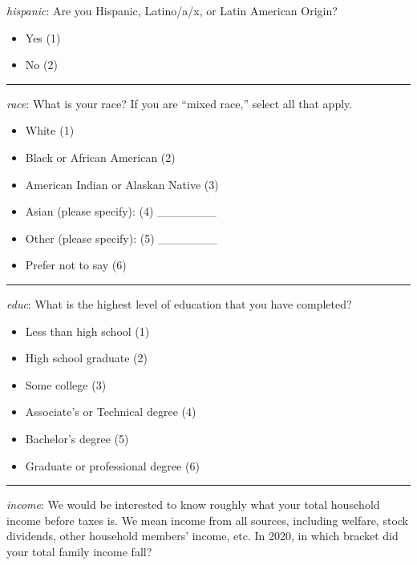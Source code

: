 \begin{singlespace}
\emph{hispanic}: Are you Hispanic, Latino/a/x, or Latin American Origin?

\begin{itemize}
\tightlist
\item
  Yes (1)
\item
  No (2)
\end{itemize}

\begin{center}\rule{0.5\linewidth}{0.5pt}\end{center}

\emph{race}: What is your race? If you are ``mixed race,'' select all that apply.

\begin{itemize}
\tightlist
\item
  White (1)
\item
  Black or African American (2)
\item
  American Indian or Alaskan Native (3)
\item
  Asian (please specify): (4) \_\_\_\_\_\_\_
\item
  Other (please specify): (5) \_\_\_\_\_\_\_
\item
  Prefer not to say (6)
\end{itemize}

\begin{center}\rule{0.5\linewidth}{0.5pt}\end{center}

\emph{educ}: What is the highest level of education that you have completed?

\begin{itemize}
\tightlist
\item
  Less than high school (1)
\item
  High school graduate (2)
\item
  Some college (3)
\item
  Associate's or Technical degree (4)
\item
  Bachelor's degree (5)
\item
  Graduate or professional degree (6)
\end{itemize}

\begin{center}\rule{0.5\linewidth}{0.5pt}\end{center}

\emph{income}: We would be interested to know roughly what your total household income
before taxes is. We mean income from all sources, including welfare, stock
dividends, other household members' income, etc. In 2020, in which bracket did your total family income fall?


\end{singlespace}

